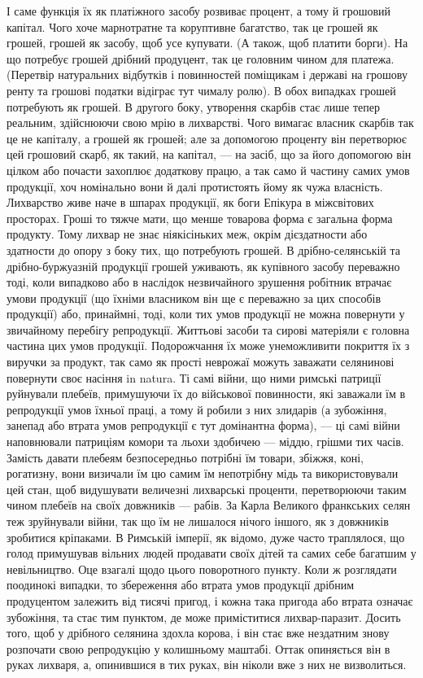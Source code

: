 \parcont{}  %
І саме функція їх як платіжного засобу розвиває процент, а тому й грошовий
капітал. Чого хоче марнотратне та коруптивне багатство, так це грошей
як грошей, грошей як засобу, щоб усе купувати. (А також, щоб платити борги).
На що потребує грошей дрібний продуцент, так це головним чином для платежа.
(Перетвір натуральних відбутків і повинностей поміщикам і державі на грошову
ренту та грошові податки відіграє тут чималу ролю). В обох випадках грошей
потребують як грошей. В другого боку, утворення скарбів стає лише тепер реальним,
здійснюючи свою мрію в лихварстві. Чого вимагає власник скарбів так це не капіталу,
а грошей як грошей; але за допомогою проценту він перетворює цей грошовий
скарб, як такий, на капітал, — на засіб, що за його допомогою він цілком або
почасти захоплює додаткову працю, а так само й частину самих умов продукції,
хоч номінально вони й далі протистоять йому як чужа власність.
Лихварство живе наче в шпарах продукції, як боги Епікура в міжсвітових просторах.
Гроші то тяжче мати, що менше товарова форма є загальна форма
продукту. Тому лихвар не знає ніякісіньких меж, окрім дієздатности або здатности
до опору з боку тих, що потребують грошей. В дрібно-селянській та
дрібно-буржуазній продукції грошей уживають, як купівного засобу переважно
тоді, коли випадково або в наслідок незвичайного зрушення робітник втрачає
умови продукції (що їхніми власником він ще є переважно за цих способів продукції)
або, принаймні, тоді, коли тих умов продукції не можна повернути у звичайному перебігу
репродукції. Життьові засоби та сирові матеріяли є головна частина цих умов
продукції. Подорожчання їх може унеможливити покриття їх з виручки за продукт,
так само як прості неврожаї можуть заважати селянинові повернути своє насіння in
natura. Ті самі війни, що ними римські патриції руйнували плебеїв, примушуючи
їх до військової повинности, які заважали їм в репродукції умов їхньої праці,
а тому й робили з них злидарів (а зубожіння, занепад або втрата умов
репродукції є тут домінантна форма), — ці самі війни наповнювали патриціям
комори та льохи здобичею — міддю, грішми тих часів. Замість давати плебеям
безпосередньо потрібні їм товари, збіжжя, коні, рогатизну, вони визичали
їм цю самим їм непотрібну мідь та використовували цей стан, щоб видушувати
величезні лихварські проценти, перетворюючи таким чином плебеїв на своїх
довжників — рабів. За Карла Великого франкських селян теж зруйнували війни,
так що їм не лишалося нічого іншого, як з довжників зробитися кріпаками.
В Римській імперії, як відомо, дуже часто траплялося, що голод примушував
вільних людей продавати своїх дітей та самих себе багатшим у невільництво. Оце
взагалі щодо цього поворотного пункту. Коли ж розглядати поодинокі випадки,
то збереження або втрата умов продукції дрібним продуцентом залежить від
тисячі пригод, і кожна така пригода або втрата означає зубожіння, та стає
тим пунктом, де може приміститися лихвар-паразит. Досить того, щоб у дрібного
селянина здохла корова, і він стає вже нездатним знову розпочати свою репродукцію
у колишньому маштабі. Оттак опиняється він в руках лихваря, а, опинившися
в тих руках, він ніколи вже з них не визволиться.

